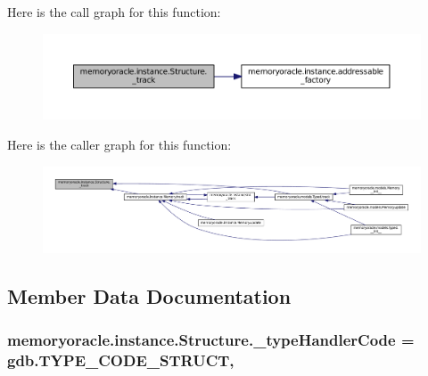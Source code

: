 Here is the call graph for this function\+:
\nopagebreak
\begin{figure}[H]
\begin{center}
\leavevmode
\includegraphics[width=350pt]{classmemoryoracle_1_1instance_1_1Structure_a200a54be462e0199b7833cbd11f81a52_cgraph}
\end{center}
\end{figure}




Here is the caller graph for this function\+:
\nopagebreak
\begin{figure}[H]
\begin{center}
\leavevmode
\includegraphics[width=350pt]{classmemoryoracle_1_1instance_1_1Structure_a200a54be462e0199b7833cbd11f81a52_icgraph}
\end{center}
\end{figure}




\subsection{Member Data Documentation}
\hypertarget{classmemoryoracle_1_1instance_1_1Structure_ad6d7eb43b40a67a235d23f2f018587f0}{}
\subsubsection[{\+\_\+type\+Handler\+Code}]{\setlength{\rightskip}{0pt plus 5cm}memoryoracle.\+instance.\+Structure.\+\_\+type\+Handler\+Code = gdb.\+T\+Y\+P\+E\+\_\+\+C\+O\+D\+E\+\_\+\+S\+T\+R\+U\+C\+T\hspace{0.3cm}{\ttfamily [static]}, {\ttfamily [private]}}\label{classmemoryoracle_1_1instance_1_1Structure_ad6d7eb43b40a67a235d23f2f018587f0}


